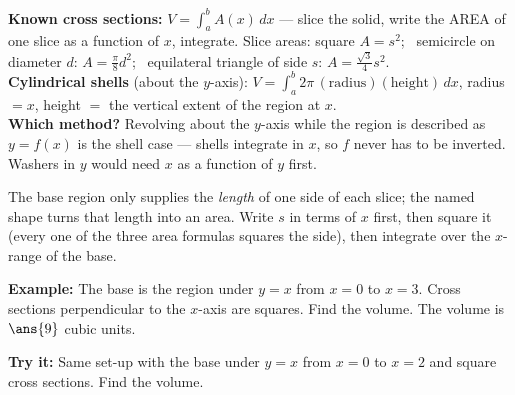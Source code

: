 \documentclass[12pt]{article}
\begin{document}

\begin{formulabox}
\textbf{Known cross sections:} $V = \int_a^b A(x)\,dx$ --- slice the solid,
write the AREA of one slice as a function of $x$, integrate. Slice areas:
square $A = s^2$; \ semicircle on diameter $d$: $A = \frac{\pi}{8}d^2$;
\ equilateral triangle of side $s$: $A = \frac{\sqrt{3}}{4}s^2$.\\[3pt]
\textbf{Cylindrical shells} (about the $y$-axis):
$V = \int_a^b 2\pi\,(\text{radius})(\text{height})\,dx$, radius $= x$,
height $=$ the vertical extent of the region at $x$.\\[3pt]
\textbf{Which method?} Revolving about the $y$-axis while the region is
described as $y = f(x)$ is the shell case --- shells integrate in $x$, so
$f$ never has to be inverted. Washers in $y$ would need $x$ as a function of
$y$ first.
\end{formulabox}


\begin{formulabox}
The base region only supplies the \emph{length} of one side of each slice; the
named shape turns that length into an area. Write $s$ in terms of $x$ first,
then square it (every one of the three area formulas squares the side), then
integrate over the $x$-range of the base.
\end{formulabox}

\begin{examplebox}
\textbf{Example:} The base is the region under $y = x$ from $x = 0$ to
$x = 3$. Cross sections perpendicular to the $x$-axis are squares. Find the
volume.
The volume is $\ans{9}$ cubic units.
\end{examplebox}

\begin{tryitbox}
\textbf{Try it:} Same set-up with the base under $y = x$ from $x = 0$ to
$x = 2$ and square cross sections. Find the volume.\\[2pt]
\end{tryitbox}

\end{document}
